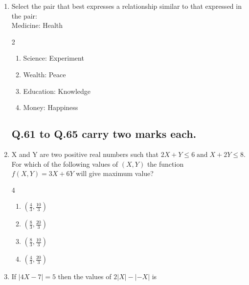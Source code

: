\documentclass[journal]{IEEEtran}
\theoremstyle{remark}
\begin{document}
\begin{enumerate}
\item   Select the pair that best expresses a relationship similar to that expressed in the pair:\\
Medicine: Health 

\hfill{}

\begin {multicols}{2}
\begin{enumerate}
\item  Science: Experiment
\item   Wealth: Peace
\item   Education: Knowledge
\item Money: Happiness
\end{enumerate}
\end{multicols}
\subsection*{Q.61 to Q.65 carry two marks each. }
\item  X and Y are two positive real numbers such that $2X+Y\leq6 \;\text{and}\;X+2Y\leq8.$ For which of the following values of $(X,Y)$ the function $f(X,Y)=3X+6Y$ will give maximum value?

\hfill{}

\begin {multicols}{4}
\begin{enumerate}
\item  $(\frac{4}{3}, \frac{10}{3})$ 
\item  $(\frac{8}{3}, \frac{20}{3})$ 
\item  $(\frac{8}{3}, \frac{10}{3})$ 
\item  $(\frac{4}{3}, \frac{20}{3})$ 
\end{enumerate}
\end{multicols}
\item  If $|4X-7|=5$ then the values of $2|X|-|-X|$ is
\hfill{}


\end{enumerate}
\end{document}

